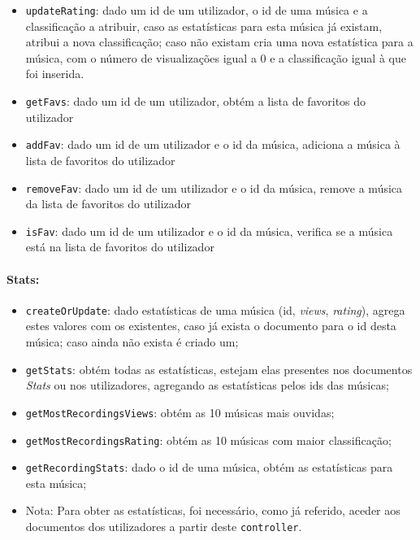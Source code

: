 \documentclass{article}
\begin{document}
\begin{itemize}
        \item \texttt{updateRating}: dado um id de um utilizador, o id de uma música e a classificação a atribuir, caso as estatísticas para esta música já existam, atribui a nova classificação; caso não existam cria uma nova estatística para a música, com o número de visualizações igual a 0 e a classificação igual à que foi inserida.
        \item \texttt{getFavs}: dado um id de um utilizador, obtém a lista de favoritos do utilizador
        \item \texttt{addFav}: dado um id de um utilizador e o id da música, adiciona a música à lista de favoritos do utilizador
        \item \texttt{removeFav}: dado um id de um utilizador e o id da música, remove a música da lista de favoritos do utilizador
        \item \texttt{isFav}: dado um id de um utilizador e o id da música, verifica se a música está na lista de favoritos do utilizador

    \end{itemize}

\paragraph{\textbf{Stats:}}
    \begin{itemize}
        \item \texttt{createOrUpdate}: dado estatísticas de uma música (id, \textit{views}, \textit{rating}), agrega estes valores com os existentes, caso já exista o documento para o id desta música; caso ainda não exista é criado um;
        \item \texttt{getStats}: obtém todas as estatísticas, estejam elas presentes nos documentos \textit{Stats} ou nos utilizadores, agregando as estatísticas pelos ids das músicas;
        \item \texttt{getMostRecordingsViews}: obtém as 10 músicas mais ouvidas;
        \item \texttt{getMostRecordingsRating}: obtém as 10 músicas com maior classificação;
        \item \texttt{getRecordingStats}: dado o id de uma música, obtém as estatísticas para esta música;
        \item Nota: Para obter as estatísticas, foi necessário, como já referido, aceder aos documentos dos utilizadores a partir deste \texttt{controller}.
    \end{itemize}
\end{document}
